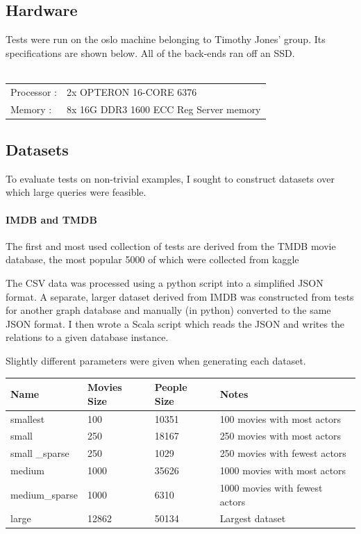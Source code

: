 \documentclass[12pt,a4paper,twoside,openright]{report}
\begin{document}
	\subsection{Hardware}
	Tests were run on the oslo machine belonging to Timothy Jones' group. Its specifications are shown below. All of the back-ends ran off an SSD.
\\\\	\begin{tabular}{|p{5cm}p{10cm}|}
	\hline
		Processor : & 2x OPTERON 16-CORE 6376 \\
		Memory : & 8x 16G DDR3 1600 ECC Reg Server memory\\
	\hline
	\end{tabular}
	\subsection{Datasets}
	To evaluate tests on non-trivial examples, I sought to construct datasets over which large queries were feasible.

		\paragraph{IMDB and TMDB}
		The first and most used collection of tests are derived from the TMDB movie database, the most popular 5000 of which were collected from kaggle \cite{TMDB5000}

The CSV data was processed using a python script into a simplified JSON format. A separate, larger dataset derived from IMDB was constructed from tests for another graph database \cite{IMDB} and manually (in python) converted to the same JSON format. I then wrote a Scala script which reads the JSON and writes the relations to a given database instance.

Slightly different parameters were given when generating each dataset.

\begin{center}
	\begin{tabular}{ |p{3cm}||p{3cm}|p{3cm}||p{3cm}|  }	
	\hline
        Name & Movies Size & People Size & Notes \\ \hline
        smallest & 100 & 10351 & 100 movies with most actors \\ \hline
        small & 250 & 18167 & 250 movies with most actors \\ \hline
        small _sparse & 250 & 1029 & 250 movies with fewest actors \\ \hline
        medium & 1000 & 35626 & 1000 movies with most actors \\ \hline
        medium_sparse & 1000 & 6310 & 1000 movies with fewest actors \\ \hline 
       large & 12862 & 50134 & Largest dataset \\ \hline
	\end{tabular}
\end{center}
\end{document}
